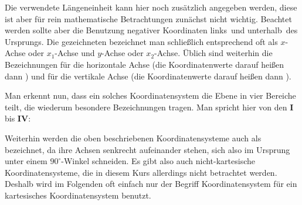 \begin{MIntro}
Die verwendete Längeneinheit kann hier noch zusätzlich angegeben werden, diese ist aber für rein mathematische Betrachtungen zunächst nicht wichtig. Beachtet werden sollte aber die Benutzung negativer Koordinaten \glqq links\grqq\ und \glqq unterhalb\grqq\ des Ursprungs. Die gezeichneten  bezeichnet man schließlich entsprechend oft als $x$-Achse oder $x_1$-Achse und $y$-Achse oder $x_2$-Achse. Üblich sind weiterhin die Bezeichnungen  für die horizontale Achse (die Koordinatenwerte darauf heißen dann ) und  für die vertikale Achse (die Koordinatenwerte darauf heißen dann ).

Man erkennt nun, dass ein solches Koordinatensystem die Ebene in vier Bereiche teilt, die wiederum besondere Bezeichnungen tragen. Man spricht hier von den  \textbf{I} bis \textbf{IV}:

\begin{center}
\end{center}

Weiterhin werden die oben beschriebenen Koordinatensysteme auch als  bezeichnet, da ihre Achsen senkrecht aufeinander stehen, sich also im Ursprung unter einem $90^{\circ}$-Winkel schneiden. Es gibt also auch nicht-kartesische Koordinatensysteme, die in diesem Kurs allerdings nicht betrachtet werden. Deshalb wird im Folgenden oft einfach nur der Begriff Koordinatensystem für ein kartesisches Koordinatensystem benutzt. 


\end{MIntro}
